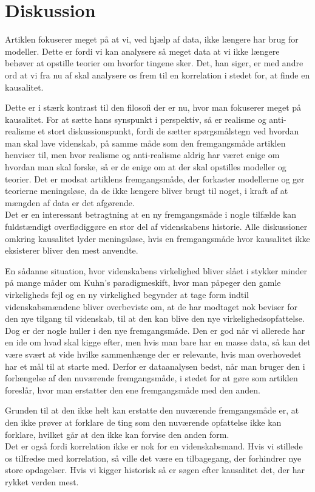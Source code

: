 \section{Diskussion}
Artiklen fokuserer meget på at vi, ved hjælp af data, ikke længere har brug for modeller. Dette er fordi vi kan analysere så meget data at vi ikke længere behøver at opstille teorier om hvorfor tingene sker. Det, han siger, er med andre ord at vi fra nu af skal analysere os frem til en korrelation i stedet for, at finde en kausalitet.

Dette er i stærk kontrast til den filosofi der er nu, hvor man fokuserer meget på kausalitet. For at sætte hans synspunkt i perspektiv, så er realisme og anti-realisme et stort diskussionspunkt, fordi de sætter spørgsmålstegn ved hvordan man skal lave videnskab, på samme måde som den fremgangsmåde artiklen henviser til, men hvor realisme og anti-realisme aldrig har været enige om hvordan man skal forske, så er de enige om at der skal opstilles modeller og teorier. Det er modsat artiklens fremgangsmåde, der forkaster modellerne og gør teorierne meningsløse, da de ikke længere bliver brugt til noget, i kraft af at mængden af data er det afgørende. \\
Det er en interessant betragtning at en ny fremgangsmåde i nogle tilfælde kan fuldstændigt overflødiggøre en stor del af videnskabens historie. Alle diskussioner omkring kausalitet lyder meningsløse, hvis en fremgangsmåde hvor kausalitet ikke eksisterer bliver den mest anvendte. 

En sådanne situation, hvor videnskabens virkelighed bliver slået i stykker minder på mange måder om Kuhn's paradigmeskift, hvor man påpeger den gamle virkeligheds fejl og en ny virkelighed begynder at tage form indtil videnskabsmændene bliver overbeviste om, at de har modtaget nok beviser for den nye tilgang til videnskab, til at den kan blive den nye virkelighedsopfattelse. \\
Dog er der nogle huller i den nye fremgangsmåde. Den er god når vi allerede har en ide om hvad skal kigge efter, men hvis man bare har en masse data, så kan det være svært at vide hvilke sammenhænge der er relevante, hvis man overhovedet har et mål til at starte med. Derfor er dataanalysen bedst, når man bruger den i forlængelse af den nuværende fremgangsmåde, i stedet for at gøre som artiklen foreslår, hvor man erstatter den ene fremgangsmåde med den anden. 

Grunden til at den ikke helt kan erstatte den nuværende fremgangsmåde er, at den ikke prøver at forklare de ting som den nuværende opfattelse ikke kan forklare, hvilket går at den ikke kan forvise den anden form. \\
Det er også fordi korrelation ikke er nok for en videnskabsmand. Hvis vi stillede os tilfredse med korrelation, så ville det være en tilbagegang, der forhindrer nye store opdagelser. Hvis vi kigger historisk så er søgen efter kausalitet det, der har rykket verden mest. 

